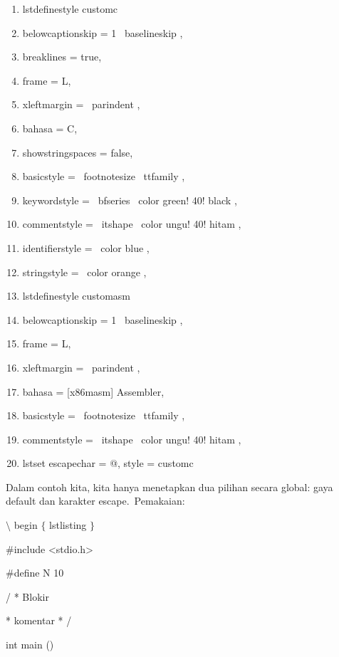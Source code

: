 \begin{enumerate}
	\item lstdefinestyle  customc 
	\item belowcaptionskip = 1 \ baselineskip ,
	\item	breaklines = true,
	\item	frame = L,
	\item	xleftmargin = \ parindent ,
	\item	bahasa = C,
	\item	showstringspaces = false,
	\item	basicstyle = \ footnotesize \ ttfamily ,
	\item	keywordstyle = \ bfseries \ color  green! 40! black  ,
	\item	commentstyle = \ itshape \ color  ungu! 40! hitam  ,
	\item	identifierstyle = \ color  blue  ,
	\item	stringstyle = \ color  orange  ,
	 \item   lstdefinestyle  customasm 
	\item	belowcaptionskip = 1 \ baselineskip ,
	\item	frame = L,
	\item	xleftmargin = \ parindent ,
	\item	bahasa = [x86masm] Assembler,
	\item	basicstyle = \ footnotesize \ ttfamily ,
	\item	commentstyle = \ itshape \ color  ungu! 40! hitam  ,
	 \item   lstset  escapechar = @, style = customc 
\end{enumerate}



Dalam contoh kita, kita hanya menetapkan dua pilihan secara global: gaya default dan karakter escape. Pemakaian:\par

 $\setminus$ begin $ \{ $ lstlisting $ \} $\par

 $\#$include <stdio.h>\par

 $\#$define N 10\par

 / * Blokir\par

 * komentar * /\par

 int main ()\par

